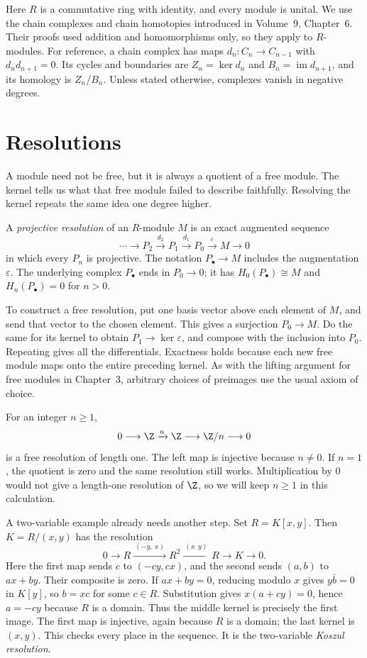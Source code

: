 Here $R$ is a commutative ring with identity, and every module is unital. We use the chain complexes and chain homotopies introduced in Volume~9, Chapter~6. Their proofs used addition and homomorphisms only, so they apply to $R$-modules. For reference, a chain complex has maps $d_n:C_n\to C_{n-1}$ with $d_nd_{n+1}=0$. Its cycles and boundaries are $Z_n=\ker d_n$ and $B_n=\operatorname{im}d_{n+1}$, and its homology is $Z_n/B_n$. Unless stated otherwise, complexes vanish in negative degrees.

\section{Resolutions}

A module need not be free, but it is always a quotient of a free module. The kernel tells us what that free module failed to describe faithfully. Resolving the kernel repeats the same idea one degree higher.

\begin{definition}\label{def:resolution}
A \emph{projective resolution} of an $R$-module $M$ is an exact augmented sequence
\[
\cdots\longrightarrow P_2\xrightarrow{d_2}P_1
\xrightarrow{d_1}P_0\xrightarrow{\varepsilon}M\longrightarrow0
\]
in which every $P_n$ is projective. The notation $P_\bullet\to M$ includes the augmentation $\varepsilon$. The underlying complex $P_\bullet$ ends in $P_0\to0$; it has $H_0(P_\bullet)\cong M$ and $H_n(P_\bullet)=0$ for $n>0$.
\end{definition}

To construct a free resolution, put one basis vector above each element of $M$, and send that vector to the chosen element. This gives a surjection $P_0\to M$. Do the same for its kernel to obtain $P_1\to\ker\varepsilon$, and compose with the inclusion into $P_0$. Repeating gives all the differentials. Exactness holds because each new free module maps onto the entire preceding kernel. As with the lifting argument for free modules in Chapter~3, arbitrary choices of preimages use the usual axiom of choice.

For an integer $n\ge1$,
\[
0\longrightarrow\Z\xrightarrow{n}\Z\longrightarrow\Z/n\longrightarrow0
\]
is a free resolution of length one. The left map is injective because $n\ne0$. If $n=1$, the quotient is zero and the same resolution still works. Multiplication by $0$ would not give a length-one resolution of $\Z$, so we will keep $n\ge1$ in this calculation.

A two-variable example already needs another step. Set $R=K[x,y]$. Then $K=R/(x,y)$ has the resolution
\[
0\longrightarrow R\xrightarrow{\ (-y,\ x)\ }R^2
\xrightarrow{\ (x\ \ y)\ }R\longrightarrow K\longrightarrow0.
\]
Here the first map sends $c$ to $(-cy,cx)$, and the second sends $(a,b)$ to $ax+by$. Their composite is zero. If $ax+by=0$, reducing modulo $x$ gives $y\bar b=0$ in $K[y]$, so $b=xc$ for some $c\in R$. Substitution gives $x(a+cy)=0$, hence $a=-cy$ because $R$ is a domain. Thus the middle kernel is precisely the first image. The first map is injective, again because $R$ is a domain; the last kernel is $(x,y)$. This checks every place in the sequence. It is the two-variable \emph{Koszul resolution}.

